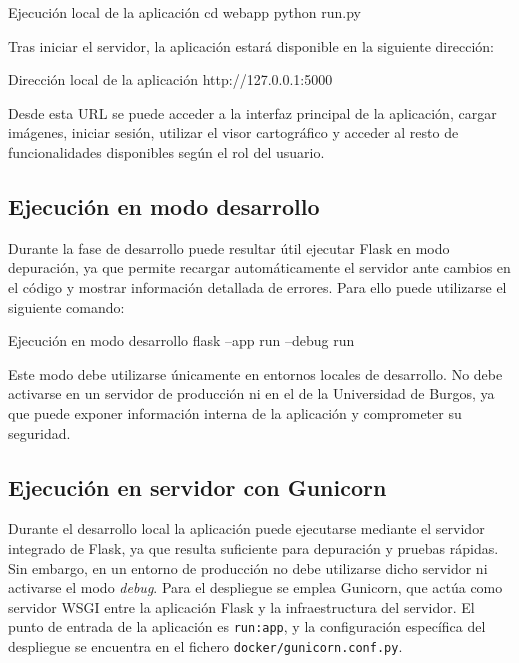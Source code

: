 \begin{pythonbox}{Ejecución local de la aplicación}
cd webapp
python run.py
\end{pythonbox}

Tras iniciar el servidor, la aplicación estará disponible en la siguiente dirección:

\begin{infocmdbox}{Dirección local de la aplicación}
http://127.0.0.1:5000
\end{infocmdbox}

Desde esta URL se puede acceder a la interfaz principal de la aplicación, cargar imágenes, iniciar sesión, utilizar el visor cartográfico y acceder al resto de funcionalidades disponibles según el rol del usuario.

\subsection{Ejecución en modo desarrollo}

Durante la fase de desarrollo puede resultar útil ejecutar Flask en modo depuración, ya que permite recargar automáticamente el servidor ante cambios en el código y mostrar información detallada de errores. Para ello puede utilizarse el siguiente comando:

\begin{pythonbox}{Ejecución en modo desarrollo}
flask --app run --debug run
\end{pythonbox}

Este modo debe utilizarse únicamente en entornos locales de desarrollo. No debe activarse en un servidor de producción ni en el de la Universidad de Burgos, ya que puede exponer información interna de la aplicación y comprometer su seguridad.

\subsection{Ejecución en servidor con Gunicorn}

Durante el desarrollo local la aplicación puede ejecutarse mediante el servidor integrado de Flask, ya que resulta suficiente para depuración y pruebas rápidas. Sin embargo, en un entorno de producción no debe utilizarse dicho servidor ni activarse el modo \textit{debug}. Para el despliegue se emplea Gunicorn, que actúa como servidor WSGI entre la aplicación Flask y la infraestructura del servidor. El punto de entrada de la aplicación es \texttt{run:app}, y la configuración específica del despliegue se encuentra en el fichero \texttt{docker/gunicorn.conf.py}.


